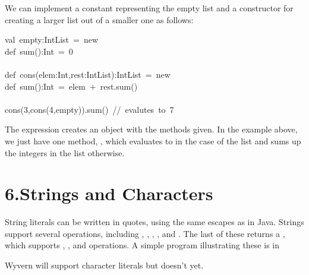 \documentclass{article}
\begin{document}
We can implement a constant representing the empty list and a
constructor for creating a larger list out of a smaller one as
follows:%
\begin{mdpre}%
\noindent val~empty:IntList~=~new\\
def~sum():Int~=~0\\
\\
def~cons(elem:Int,rest:IntList):IntList~=~new\\
def~sum():Int~=~elem~+~rest.sum()\\
\\
cons(3,cons(4,empty)).sum()~//~evalutes~to~7%
\end{mdpre}\noindent{}The  expression creates an object with the methods given.  In
the example above, we just have one method, , which evaluates
to  in the case of the  list and sums up the integers in
the list otherwise.

\section{6.\hspace*{0.5em}Strings and Characters}\label{sec-strings-and-characters}%

\noindent{}String literals can be written in quotes, using the same escapes as in Java.
Strings support several operations, including \mdcode{==}, \mdcode{\textless{}}, \mdcode{\textgreater{}}, ,
and .  The last of these returns a , which supports
\mdcode{==}, \mdcode{\textless{}}, and \mdcode{\textgreater{}} operations.  A simple program illustrating these is in

Wyvern will support character literals but doesn't yet.%

\end{document}
